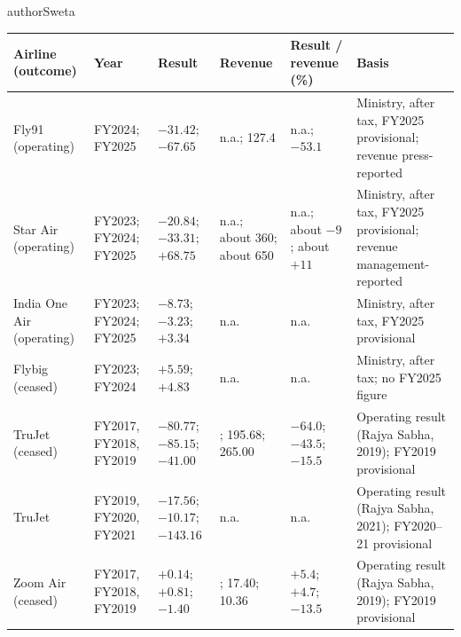 \begin{mergedcontribution}{authorSweta}
\begin{minipage}{\textwidth}
\footnotesize
\setlength{\tabcolsep}{3pt}
\label{tab:o3-fy25}
\fontsize{10}{12}\selectfont{}\setlength{\tabcolsep}{3pt}
\renewcommand{\arraystretch}{1.15}
\begin{tabular}{|>{\raggedright\arraybackslash}p{}|>{\raggedright\arraybackslash}p{}|>{\raggedright\arraybackslash}p{}|>{\raggedright\arraybackslash}p{}|>{\raggedright\arraybackslash}p{}|>{\raggedright\arraybackslash}p{}|}
\hline
\textbf{Airline (outcome)} & \textbf{Year} & \textbf{Result} & \textbf{Revenue} & \textbf{Result / revenue (\%)} & \textbf{Basis} \\
\hline
Fly91 (operating) & FY2024; FY2025 & $-31.42$; $-67.65$ & n.a.; 127.4 & n.a.; $-53.1$ & Ministry, after tax, FY2025 provisional; revenue press-reported \\
\hline
Star Air (operating) & FY2023; FY2024; FY2025 & $-20.84$; $-33.31$; $+68.75$ & n.a.; about 360; about 650 & n.a.; about $-9$; about $+11$ & Ministry, after tax, FY2025 provisional; revenue management-reported \\
\hline
India One Air (operating) & FY2023; FY2024; FY2025 & $-8.73$; $-3.23$; $+3.34$ & n.a. & n.a. & Ministry, after tax, FY2025 provisional \\
\hline
Flybig (ceased) & FY2023; FY2024 & $+5.59$; $+4.83$ & n.a. & n.a. & Ministry, after tax; no FY2025 figure \\
\hline
TruJet (ceased) & FY2017, FY2018, FY2019 & $-80.77$; $-85.15$; $-41.00$ & 126.14; 195.68; 265.00 & $-64.0$; $-43.5$; $-15.5$ & Operating result (Rajya Sabha, 2019); FY2019 provisional \\
\hline
TruJet & FY2019, FY2020, FY2021 & $-17.56$; $-10.17$; $-143.16$ & n.a. & n.a. & Operating result (Rajya Sabha, 2021); FY2020--21 provisional \\
\hline
Zoom Air (ceased) & FY2017, FY2018, FY2019 & $+0.14$; $+0.81$; $-1.40$ & 2.61; 17.40; 10.36 & $+5.4$; $+4.7$; $-13.5$ & Operating result (Rajya Sabha, 2019); FY2019 provisional \\

\end{tabular}
\end{minipage}
\end{mergedcontribution}
